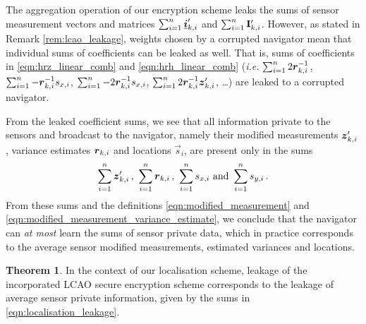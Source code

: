 \documentclass[10pt,journal,compsoc]{IEEEtran}
\theoremstyle{definition}
\theoremstyle{definition}
\newtheorem{theorem}{Theorem}[section]
\theoremstyle{remark}
\begin{document}
The aggregation operation of our encryption scheme leaks the sums of sensor measurement vectors and matrices $\sum_{i=1}^n{\boldsymbol{\underline{i}}}'_{k,i}$ and $\sum_{i=1}^n{{\mathbf{I}}}'_{k,i}$. However, as stated in Remark \ref{rem:lcao_leakage}, weights chosen by a corrupted navigator mean that individual sums of coefficients can be leaked as well. That is, sums of coefficients in \eqref{eqn:hrz_linear_comb} and \eqref{eqn:hrh_linear_comb} (\textit{i.e.} $\sum_{i=1}^n2{\boldsymbol{r}}^{-1}_{k,i}$, $\sum_{i=1}^n-{\boldsymbol{r}}^{-1}_{k,i}s_{x,i}$, $\sum_{i=1}^n-2{\boldsymbol{r}}^{-1}_{k,i}s_{x,i}$, $\sum_{i=1}^n2{\boldsymbol{r}}^{-1}_{k,i}{\boldsymbol{z}}'_{k,i}$, \dots) are leaked to a corrupted navigator.

From the leaked coefficient sums, we see that all information private to the sensors and broadcast to the navigator, namely their modified measurements ${\boldsymbol{z}}'_{k,i}$, variance estimates ${\boldsymbol{r}}_{k,i}$ and locations $\vec{s}_i$, are present only in the sums
\begin{equation}
    \sum_{i=1}^n\rv{z}'_{k,i}\,,\ \sum_{i=1}^n\rv{r}_{k,i}\,,\ \sum_{i=1}^ns_{x,i}\ \textrm{and}\ \sum_{i=1}^ns_{y,i}\,.\label{eqn:localisation_leakage}
\end{equation}
From these sums and the definitions \eqref{eqn:modified_measurement} and \eqref{eqn:modified_measurement_variance_estimate}, we conclude that the navigator can \textit{at most} learn the sums of sensor private data, which in practice corresponds to the average sensor modified measurements, estimated variances and locations.
\begin{theorem}
    In the context of our localisation scheme, leakage of the incorporated LCAO secure encryption scheme corresponds to the leakage of average sensor private information, given by the sums in \eqref{eqn:localisation_leakage}.
\end{theorem}

% 
%                                                                          
%                                                                          
%                                                                          
% 
\end{document}
